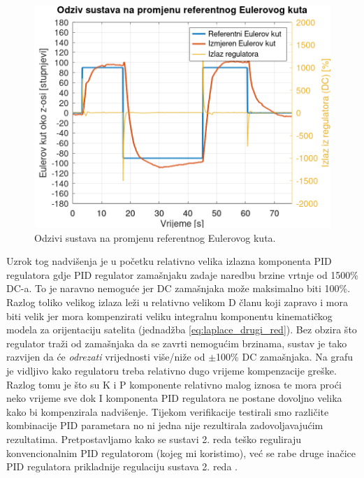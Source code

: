 \documentclass[times, utf8, diplomski, numeric]{templates/template}
\begin{document}
{{        \begin{figure}[h!]
        \centering
        \includegraphics[width=1.0\textwidth]{other/angle_reg_user.png}
        \caption{Odzivi sustava na promjenu referentnog Eulerovog kuta.}
        \label{fig:angle_reg_user}
        \end{figure}

        Uzrok tog nadvišenja je u početku relativno velika izlazna komponenta PID regulatora gdje PID regulator zamašnjaku zadaje naredbu brzine vrtnje od 1500\% DC-a. To je naravno nemoguće jer DC zamašnjaka može maksimalno biti 100\%. Razlog toliko velikog izlaza leži u relativno velikom D članu koji zapravo i mora biti velik jer mora kompenzirati veliku integralnu komponentu kinematičkog modela za orijentaciju satelita (jednadžba \ref{eq:laplace_drugi_red}). Bez obzira što regulator traži od zamašnjaka da se zavrti nemogućim brzinama, sustav je tako razvijen da će \emph{odrezati}  vrijednosti više/niže od $\pm$100\% DC zamašnjaka. Na grafu je vidljivo kako regulatoru treba relativno dugo vrijeme kompenzacije greške. Razlog tomu je što su K i P komponente relativno malog iznosa te mora proći neko vrijeme sve dok I komponenta PID regulatora ne postane dovoljno velika kako bi kompenzirala nadvišenje. Tijekom  verifikacije testirali smo različite kombinacije PID parametara no ni jedna nije rezultirala zadovoljavajućim rezultatima. Pretpostavljamo kako se sustavi 2. reda teško reguliraju konvencionalnim PID regulatorom (kojeg mi koristimo), već se rabe druge inačice PID regulatora prikladnije regulaciju sustava 2. reda \cite{reg_2_red}.

}}
\end{document}
